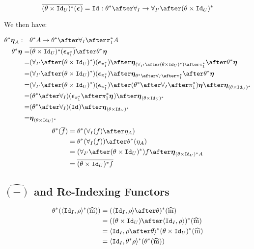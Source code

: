 \documentclass{report}
\begin{document}
    \begin{equation}
        \bar{(\theta\times\Id{U})\star(\counit{})} = \Id{}: \theta\star\after\allI \rightarrow \allII\after(\theta\times\Id{U})\star
    \end{equation}
    
    We then have:
    
    \begin{align*}
        \theta\star\unit{A}:\quad&\theta\star A \rightarrow \theta\star\after\allI\after\pstar A\\
        \theta\star\unit{} =& \bar{(\theta\times\Id{U})\star(\counit{\pstar})}\after\theta\star\unit{}\\
        =& (\allII\after(\theta\times\Id{U})\star)(\counit{\pstar})\after\unit{(\allII\after(\theta\times\Id{U})\star)\after\pstar}\after\theta\star\unit{}\\
        = & (\allII\after(\theta\times\Id{U})\star)(\counit{\pstar})\after\unit{\theta\star\after\allI\after\pstar}\after\theta\star\unit{}\\
        = & (\allII\after(\theta\times\Id{U})\star)(\counit{\pstar}) \after(\theta\star\after\allI\after\pstar)\unit{} \after\unit{(\theta\times\Id{U})\star}\\
        = & (\theta\star\after\allI)(\counit{\pstar}
        \after\pstar\unit{})\after\unit{(\theta\times\Id{U})\star}\\
        = & (\theta\star\after\allI)(\Id{})\after\unit{(\theta\times\Id{U})\star}\\
        = & \unit{(\theta\times\Id{U})\star}
    \end{align*}
    \begin{align*}
        \theta\star(\bar{f}) & = \theta\star(\allI(f)\after\eta_A)\\
        & = \theta\star(\allI(f))\after\theta\star(\eta_A)\\
        & =  (\allII\after(\theta\times\Id{U})\star)f \after\unit{(\theta\times\Id{U})\star A}\\
        & = \bar{(\theta\times\Id{U})\star f}\\
    \end{align*}
    
    \subsection{$\hat{(-)}$ and Re-Indexing Functors}
    \begin{align*}
        \theta\star(\pr{\Id{I}}{\rho}\star(\widehat{m})) &= (\pr{\Id{I}}{\rho}\after\theta)\star(\widehat{m})\\
        & = ((\theta\times\Id{U})\after\pr{\Id{I}}{\rho})\star(\widehat{m})\\
        & = \pr{\Id{I}}{\rho\after\theta}\star(\theta\times\Id{U})\star(\widehat{m}) \\
        & = \pr{\Id{I}}{\theta\star\rho}\star(\theta\star(\widehat{m}))
    \end{align*}
\end{document}
